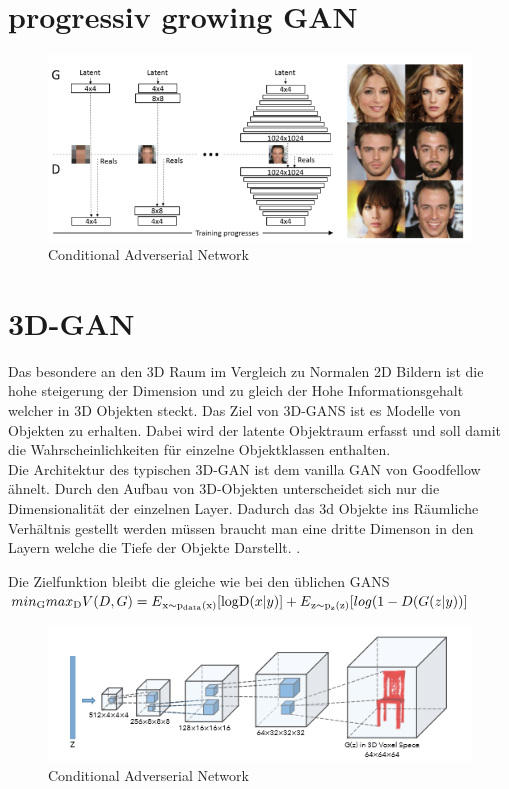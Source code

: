 \documentclass{llncs}
\begin{document}
\section{progressiv growing GAN}
\begin{figure}[htbp] 
	\centering
	\includegraphics[width=1.2\textwidth]{proggan.png}
	\caption{Conditional Adverserial Network}
	\label{fig:Bild2}
\end{figure}

\cite{progre}
\section{3D-GAN}
Das besondere an den 3D Raum im Vergleich zu Normalen 2D Bildern ist die hohe steigerung der Dimension und zu gleich der Hohe Informationsgehalt welcher in 3D Objekten steckt. Das Ziel von 3D-GANS ist es Modelle von Objekten zu erhalten. Dabei wird der latente Objektraum erfasst und soll damit die Wahrscheinlichkeiten für einzelne Objektklassen enthalten. 
\\
Die Architektur des typischen 3D-GAN ist dem vanilla GAN von Goodfellow ähnelt. Durch den Aufbau von 3D-Objekten unterscheidet sich nur die Dimensionalität der einzelnen Layer. Dadurch das 3d Objekte ins Räumliche Verhältnis gestellt werden müssen braucht man eine dritte Dimenson in den Layern welche die Tiefe der Objekte Darstellt. \cite{3d}. 

Die Zielfunktion bleibt die gleiche wie bei den üblichen GANS
\begin{math}
min\textsubscript{G} max\textsubscript{D}V(D,G)=E\textsubscript{x$\sim$p\textsubscript{data}(x)}[\log $D$(x|y)]  + E\textsubscript{z$\sim$p\textsubscript{z}(z)}[log(1-D(G(z|y))]           
\end{math}

\begin{figure}[htbp] 
	\centering
	\includegraphics[width=1.2\textwidth]{3dgan.png}
	\caption{Conditional Adverserial Network}
	\label{fig:Bild2}
\end{figure}
\cite{3d}
\end{document}
